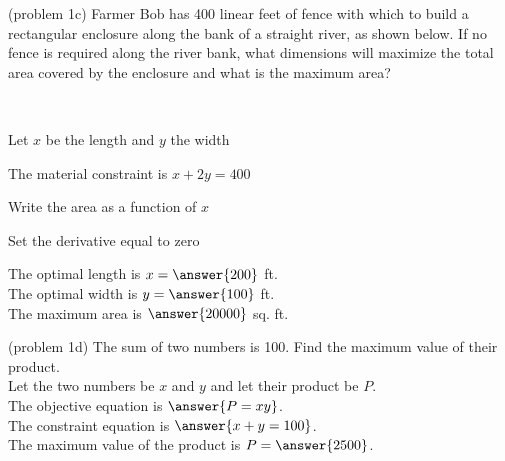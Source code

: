 \documentclass[handout]{ximera}
\begin{document}
\begin{problem}(problem 1c)
Farmer Bob has 400 linear feet of fence with which to build a 
rectangular enclosure along the bank of a straight river, as shown below.  
If no fence is required along the river bank, what dimensions will maximize the total area 
covered by the enclosure and what is the maximum area?
\begin{center}
\\
\end{center}
\begin{hint}
Let $x$ be the length and $y$ the width
\end{hint}
\begin{hint}
The material constraint is $x+2y = 400$
\end{hint}
\begin{hint}
Write the area as a function of $x$
\end{hint}
\begin{hint}
Set the derivative equal to zero
\end{hint}

The optimal length is $x= \answer{200}$ ft.\\
The optimal width is $y = \answer{100}$ ft.\\
The maximum area is $\answer{20000}$ sq. ft.


\end{problem}


\begin{problem}(problem 1d)
The sum of two numbers is 100.  Find the maximum value of their product.\\
Let the two numbers be $x$ and $y$ and let their product be $P$.\\
The objective equation is $\answer{P=xy}$.\\
The constraint equation is $\answer{x + y = 100}$.\\
The maximum value of the product is $P= \answer{2500}$.
\end{problem}
\end{document}
